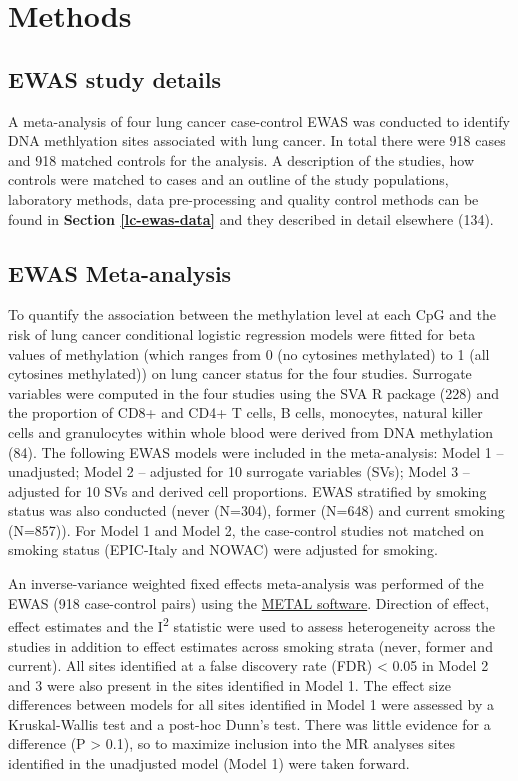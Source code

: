 \documentclass[11pt,oneside]{bristolthesis}
\begin{document}
\hypertarget{methods-07}{%
\section{Methods}\label{methods-07}}

\hypertarget{ewas-study-details}{%
\subsection{EWAS study details}\label{ewas-study-details}}

A meta-analysis of four lung cancer case-control EWAS was conducted to identify DNA methlyation sites associated with lung cancer. In total there were 918 cases and 918 matched controls for the analysis. A description of the studies, how controls were matched to cases and an outline of the study populations, laboratory methods, data pre-processing and quality control methods can be found in \textbf{Section \ref{lc-ewas-data}} and they described in detail elsewhere (134).

\hypertarget{methods-ewas-meta-analysis}{%
\subsection{EWAS Meta-analysis}\label{methods-ewas-meta-analysis}}

To quantify the association between the methylation level at each CpG and the risk of lung cancer conditional logistic regression models were fitted for beta values of methylation (which ranges from 0 (no cytosines methylated) to 1 (all cytosines methylated)) on lung cancer status for the four studies. Surrogate variables were computed in the four studies using the SVA R package (228) and the proportion of CD8+ and CD4+ T cells, B cells, monocytes, natural killer cells and granulocytes within whole blood were derived from DNA methylation (84). The following EWAS models were included in the meta-analysis: Model 1 -- unadjusted; Model 2 -- adjusted for 10 surrogate variables (SVs); Model 3 -- adjusted for 10 SVs and derived cell proportions. EWAS stratified by smoking status was also conducted (never (N=304), former (N=648) and current smoking (N=857)). For Model 1 and Model 2, the case-control studies not matched on smoking status (EPIC-Italy and NOWAC) were adjusted for smoking.

An inverse-variance weighted fixed effects meta-analysis was performed of the EWAS (918 case-control pairs) using the \href{http://csg.sph.umich.edu/abecasis/metal/}{METAL software}. Direction of effect, effect estimates and the I\textsuperscript{2} statistic were used to assess heterogeneity across the studies in addition to effect estimates across smoking strata (never, former and current). All sites identified at a false discovery rate (FDR) \textless{} 0.05 in Model 2 and 3 were also present in the sites identified in Model 1. The effect size differences between models for all sites identified in Model 1 were assessed by a Kruskal-Wallis test and a post-hoc Dunn's test. There was little evidence for a difference (P \textgreater{} 0.1), so to maximize inclusion into the MR analyses sites identified in the unadjusted model (Model 1) were taken forward.
\end{document}
